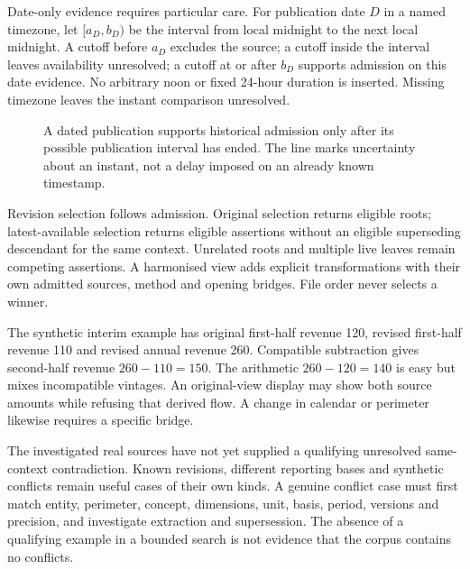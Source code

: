 Date-only evidence requires particular care. For publication date $D$ in a
named timezone, let $[a_D,b_D)$ be the interval from local midnight to the next
local midnight. A cutoff before $a_D$ excludes the source; a cutoff inside the
interval leaves availability unresolved; a cutoff at or after $b_D$ supports
admission on this date evidence. No arbitrary noon or fixed 24-hour duration
is inserted. Missing timezone leaves the instant comparison unresolved.

\begin{figure}[htbp]
\centering
{}
\caption{A dated publication supports historical admission only after its
possible publication interval has ended. The line marks uncertainty about an
instant, not a delay imposed on an already known timestamp.}
\end{figure}

Revision selection follows admission. Original selection returns eligible
roots; latest-available selection returns eligible assertions without an
eligible superseding descendant for the same context. Unrelated roots and
multiple live leaves remain competing assertions. A harmonised view adds
explicit transformations with their own admitted sources, method and opening
bridges. File order never selects a winner.

The synthetic interim example has original first-half revenue 120, revised
first-half revenue 110 and revised annual revenue 260. Compatible subtraction
gives second-half revenue $260-110=150$. The arithmetic $260-120=140$ is easy
but mixes incompatible vintages. An original-view display may show both source
amounts while refusing that derived flow. A change in calendar or perimeter
likewise requires a specific bridge.

The investigated real sources have not yet supplied a qualifying unresolved
same-context contradiction. Known revisions, different reporting bases and
synthetic conflicts remain useful cases of their own kinds. A genuine conflict
case must first match entity, perimeter, concept, dimensions, unit, basis,
period, versions and precision, and investigate extraction and supersession.
The absence of a qualifying example in a bounded search is not evidence that
the corpus contains no conflicts.
